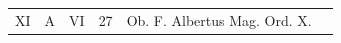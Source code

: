 \documentclass[openany]{book}
\renewcommand{\\}{\par\hspace*{.1em}} %
\begin{document}
\begin{center}
\begin{tabular}{l | l | l | r | l l}
\color{Red} XI & \color{Red} A & \color{Red} VI & 27 & Ob. F. Albertus Mag. Ord. X. \\



\end{tabular}
\end{center}
\end{document}
